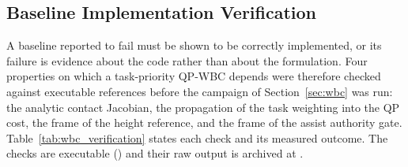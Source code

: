 \documentclass[a4paper,fleqn]{cas-dc}
\begin{document}
\subsection{Baseline Implementation Verification}
\label{sec:wbc_verification_sec}

A baseline reported to fail must be shown to be correctly implemented, or its
failure is evidence about the code rather than about the formulation. Four
properties on which a task-priority QP-WBC depends were therefore checked
against executable references before the campaign of Section~\ref{sec:wbc} was run:
the analytic contact Jacobian, the propagation of the task weighting into the QP
cost, the frame of the height reference, and the frame of the assist authority
gate. Table~\ref{tab:wbc_verification} states each check and its measured
outcome. The checks are executable
() and their raw output is archived at
.
\end{document}
